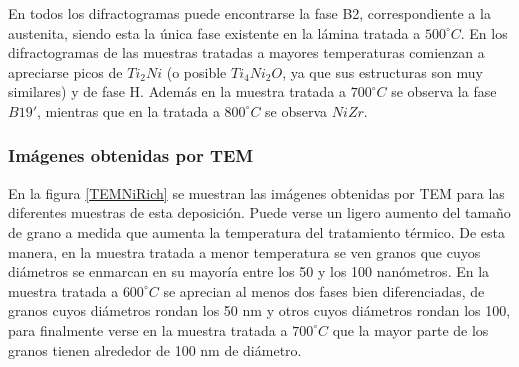 \documentclass[12pt]{article}
\theoremstyle{definition}
\theoremstyle{remark}
\begin{document}
{En todos los difractogramas puede encontrarse la fase B2, correspondiente a la austenita, siendo esta la única fase existente en la lámina tratada a $500 ^\circ C$. En los difractogramas de las muestras tratadas a mayores temperaturas comienzan a apreciarse picos de $Ti_2Ni$ (o posible $Ti_4Ni_2O$, ya que sus estructuras son muy similares) y de fase H. Además en la muestra tratada a $700 ^\circ C$ se observa la fase $B19'$, mientras que en la tratada a $800 ^\circ C$ se observa $NiZr$.

\subsubsection{Imágenes obtenidas por TEM}

En la figura \ref{TEMNiRich} se muestran las imágenes obtenidas por TEM para las diferentes muestras de esta deposición. Puede verse un ligero aumento del tamaño de grano a medida que aumenta la temperatura del tratamiento térmico. De esta manera, en la muestra tratada a menor temperatura se ven granos que cuyos diámetros se enmarcan en su mayoría entre los 50 y los 100 nanómetros. En la muestra tratada a $600 ^\circ C$ se aprecian al menos dos fases bien diferenciadas, de granos cuyos diámetros rondan los 50 nm y otros cuyos diámetros rondan los 100, para finalmente verse en la muestra tratada a $700 ^\circ C$ que la mayor parte de los granos tienen alrededor de 100 nm de diámetro. 

}
\end{document}
